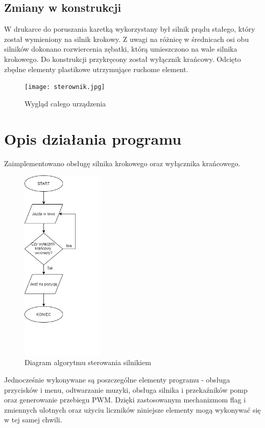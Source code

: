 \documentclass[10pt, a4paper]{article}
\begin{document}
\subsection{Zmiany w konstrukcji}
W drukarce do poruszania karetką wykorzystany był silnik prądu stałego, który został wymieniony na silnik krokowy. Z uwagi na różnicę w średnicach osi obu silników dokonano rozwiercenia zębatki, którą umieszczono na wale silnika krokowego. Do konstrukcji przykręcony został wyłącznik krańcowy.
Odcięto zbędne elementy plastikowe utrzymujące ruchome element.


\begin{figure}[H]
	\centering
	\texttt{[image: sterownik.jpg]}
	\caption{Wygląd całego urządzenia}
	\label{fig:Barman}
\end{figure}
\newpage


\section{Opis działania programu}

Zaimplementowano obsługę silnika krokowego oraz wyłącznika krańcowego.

\begin{figure}[H]
	\centering
	\includegraphics[width=0.35\textwidth]{algorytm2.png}
	\caption{Diagram algorytmu sterowania silnikiem}
	\label{fig:Diagram}
\end{figure}
 \newpage
 
Jednocześnie wykonywane są poszczególne elementy programu - obsługa przycisków i menu, odtwarzanie muzyki, obsługa silnika i przekaźników pomp oraz generowanie przebiegu PWM. Dzięki zastosowanym mechanizmom flag i zmiennych ulotnych oraz użyciu liczników niniejsze elementy mogą wykonywać się w tej samej chwili.
 
\end{document}
